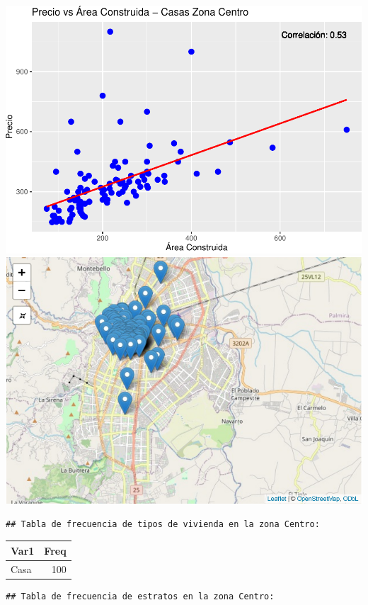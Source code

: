 \documentclass[
]{article}
\begin{document}
\includegraphics{A2_U2_InformeEjecutivo_files/figure-latex/unnamed-chunk-11-1.pdf}
\includegraphics{A2_U2_InformeEjecutivo_files/figure-latex/unnamed-chunk-11-2.pdf}

\begin{verbatim}
## Tabla de frecuencia de tipos de vivienda en la zona Centro:
\end{verbatim}

\begin{longtable}[]{@{}lr@{}}
\toprule\noalign{}
Var1 & Freq \\
\midrule\noalign{}
\endhead
\bottomrule\noalign{}
\endlastfoot
Casa & 100 \\
\end{longtable}

\begin{verbatim}
## Tabla de frecuencia de estratos en la zona Centro:
\end{verbatim}
\end{document}
